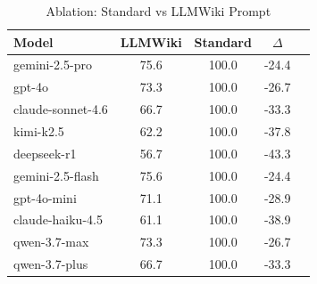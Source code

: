 \begin{table}[ht]
\centering
\caption{Ablation: Standard vs LLMWiki Prompt}
\label{tab:ablation_v3}
\begin{tabular}{@{}lcccc@{}}
\toprule
Model & LLMWiki & Standard & $\Delta$ \\ 
\midrule
gemini-2.5-pro & 75.6 & 100.0 & -24.4 \\ 
gpt-4o & 73.3 & 100.0 & -26.7 \\ 
claude-sonnet-4.6 & 66.7 & 100.0 & -33.3 \\ 
kimi-k2.5 & 62.2 & 100.0 & -37.8 \\ 
deepseek-r1 & 56.7 & 100.0 & -43.3 \\ 
gemini-2.5-flash & 75.6 & 100.0 & -24.4 \\ 
gpt-4o-mini & 71.1 & 100.0 & -28.9 \\ 
claude-haiku-4.5 & 61.1 & 100.0 & -38.9 \\ 
qwen-3.7-max & 73.3 & 100.0 & -26.7 \\ 
qwen-3.7-plus & 66.7 & 100.0 & -33.3 \\ 
\bottomrule
\end{tabular}
\end{table}